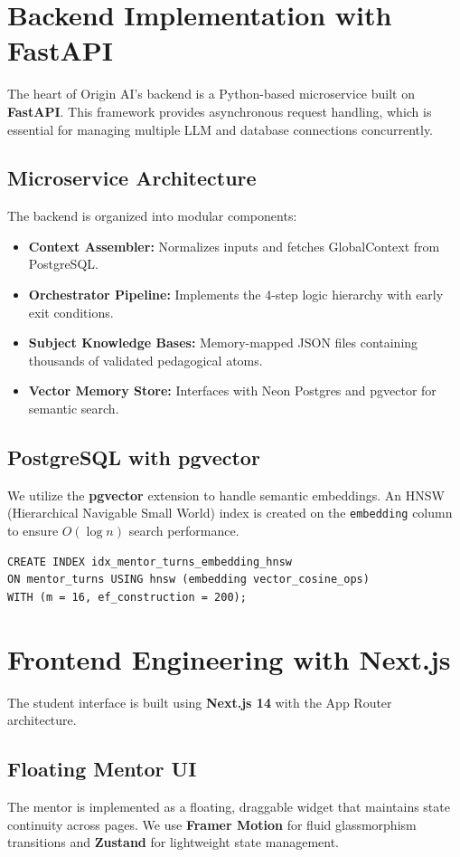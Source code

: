 \section{Backend Implementation with FastAPI}

The heart of Origin AI's backend is a Python-based microservice built on \textbf{FastAPI}. This framework provides asynchronous request handling, which is essential for managing multiple LLM and database connections concurrently.

\subsection{Microservice Architecture}
The backend is organized into modular components:
\begin{itemize}
    \item \textbf{Context Assembler:} Normalizes inputs and fetches GlobalContext from PostgreSQL.
    \item \textbf{Orchestrator Pipeline:} Implements the 4-step logic hierarchy with early exit conditions.
    \item \textbf{Subject Knowledge Bases:} Memory-mapped JSON files containing thousands of validated pedagogical atoms.
    \item \textbf{Vector Memory Store:} Interfaces with Neon Postgres and pgvector for semantic search.
\end{itemize}

\subsection{PostgreSQL with pgvector}
We utilize the \textbf{pgvector} extension to handle semantic embeddings. An HNSW (Hierarchical Navigable Small World) index is created on the \texttt{embedding} column to ensure $O(\log n)$ search performance.
\begin{verbatim}
CREATE INDEX idx_mentor_turns_embedding_hnsw 
ON mentor_turns USING hnsw (embedding vector_cosine_ops)
WITH (m = 16, ef_construction = 200);
\end{verbatim}

\section{Frontend Engineering with Next.js}

The student interface is built using \textbf{Next.js 14} with the App Router architecture. 

\subsection{Floating Mentor UI}
The mentor is implemented as a floating, draggable widget that maintains state continuity across pages. We use \textbf{Framer Motion} for fluid glassmorphism transitions and \textbf{Zustand} for lightweight state management.

